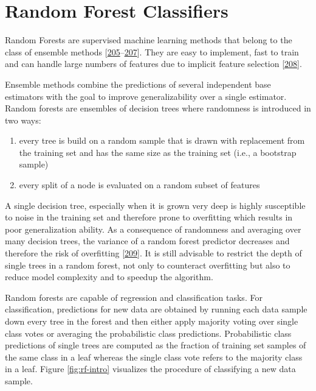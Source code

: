 \documentclass[11pt,a4paper,twoside]{book}
\providecommand{\tightlist}{%
  \setlength{\itemsep}{0pt}\setlength{\parskip}{0pt}}
\theoremstyle{definition}
\theoremstyle{definition}
\theoremstyle{remark}
\begin{document}
\section{Random Forest Classifiers}\label{random-forest-classifiers}

Random Forests are supervised machine learning methods that belong to
the class of ensemble methods
{[}\protect\hyperlink{ref-Ho1998}{205}--\protect\hyperlink{ref-Breiman2001}{207}{]}.
They are easy to implement, fast to train and can handle large numbers
of features due to implicit feature selection
{[}\protect\hyperlink{ref-Menze2009}{208}{]}.

Ensemble methods combine the predictions of several independent base
estimators with the goal to improve generalizability over a single
estimator. Random forests are ensembles of decision trees where
randomness is introduced in two ways:

\begin{enumerate}
\def\labelenumi{\arabic{enumi}.}
\tightlist
\item
  every tree is build on a random sample that is drawn with replacement
  from the training set and has the same size as the training set (i.e.,
  a bootstrap sample)
\item
  every split of a node is evaluated on a random subset of features
\end{enumerate}

A single decision tree, especially when it is grown very deep is highly
susceptible to noise in the training set and therefore prone to
overfitting which results in poor generalization ability. As a
consequence of randomness and averaging over many decision trees, the
variance of a random forest predictor decreases and therefore the risk
of overfitting {[}\protect\hyperlink{ref-Louppe2014}{209}{]}. It is
still advisable to restrict the depth of single trees in a random
forest, not only to counteract overfitting but also to reduce model
complexity and to speedup the algorithm.

Random forests are capable of regression and classification tasks. For
classification, predictions for new data are obtained by running each
data sample down every tree in the forest and then either apply majority
voting over single class votes or averaging the probabilistic class
predictions. Probabilistic class predictions of single trees are
computed as the fraction of training set samples of the same class in a
leaf whereas the single class vote refers to the majority class in a
leaf. Figure \ref{fig:rf-intro} visualizes the procedure of classifying
a new data sample.
\end{document}
